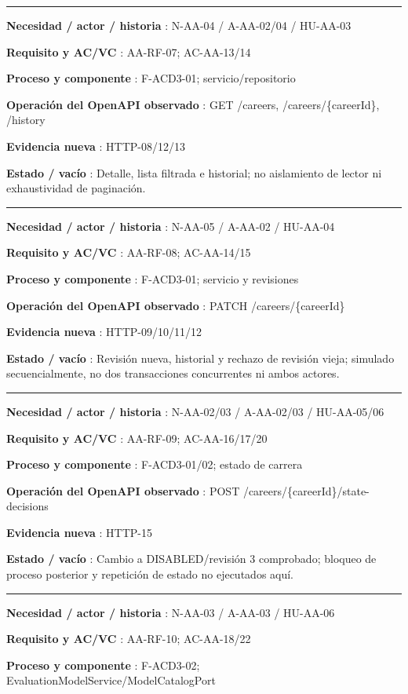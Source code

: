 \documentclass[11pt,a4paper]{article}
\begin{document}
\medskip\hrule\medskip

\textbf{Necesidad / actor / historia }: N-AA-04 / A-AA-02/04 / HU-AA-03

\textbf{Requisito y AC/VC }: AA-RF-07; AC-AA-13/14

\textbf{Proceso y componente }: F-ACD3-01; servicio/repositorio

\textbf{Operación del OpenAPI observado }: GET /careers,
/careers/\{careerId\}, /history

\textbf{Evidencia nueva }: HTTP-08/12/13

\textbf{Estado / vacío }: Detalle, lista filtrada e historial; no
aislamiento de lector ni exhaustividad de paginación.

\medskip\hrule\medskip

\textbf{Necesidad / actor / historia }: N-AA-05 / A-AA-02 / HU-AA-04

\textbf{Requisito y AC/VC }: AA-RF-08; AC-AA-14/15

\textbf{Proceso y componente }: F-ACD3-01; servicio y revisiones

\textbf{Operación del OpenAPI observado }: PATCH /careers/\{careerId\}

\textbf{Evidencia nueva }: HTTP-09/10/11/12

\textbf{Estado / vacío }: Revisión nueva, historial y rechazo de
revisión vieja; simulado secuencialmente, no dos transacciones
concurrentes ni ambos actores.

\medskip\hrule\medskip

\textbf{Necesidad / actor / historia }: N-AA-02/03 / A-AA-02/03 /
HU-AA-05/06

\textbf{Requisito y AC/VC }: AA-RF-09; AC-AA-16/17/20

\textbf{Proceso y componente }: F-ACD3-01/02; estado de carrera

\textbf{Operación del OpenAPI observado }: POST
/careers/\{careerId\}/state-decisions

\textbf{Evidencia nueva }: HTTP-15

\textbf{Estado / vacío }: Cambio a DISABLED/revisión 3 comprobado;
bloqueo de proceso posterior y repetición de estado no ejecutados aquí.

\medskip\hrule\medskip

\textbf{Necesidad / actor / historia }: N-AA-03 / A-AA-03 / HU-AA-06

\textbf{Requisito y AC/VC }: AA-RF-10; AC-AA-18/22

\textbf{Proceso y componente }: F-ACD3-02;
EvaluationModelService/ModelCatalogPort
\end{document}
